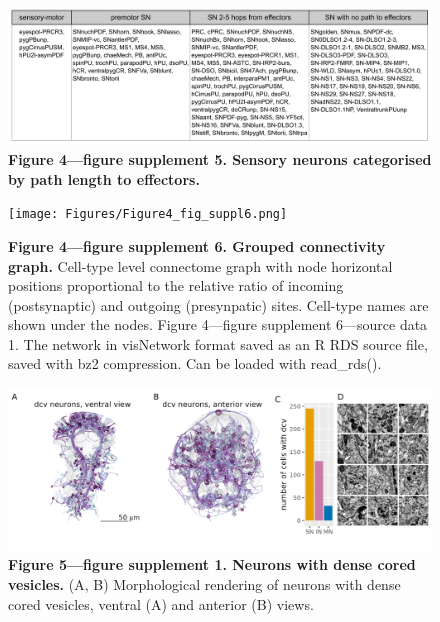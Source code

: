 \documentclass[
  11pt,
]{article}
\begin{document}
\begin{figure}[H]

{\centering \includegraphics[width=1\textwidth,height=\textheight]{Figures/Figure4_fig_suppl5.png}

}

\caption{\textbf{Figure 4---figure supplement 5. Sensory neurons
categorised by path length to effectors.}}

\end{figure}%

\begin{figure}[H]

{\centering \texttt{[image: Figures/Figure4\_fig\_suppl6.png]}

}

\caption{\textbf{Figure 4---figure supplement 6. Grouped connectivity
graph. } Cell-type level connectome graph with node horizontal positions
proportional to the relative ratio of incoming (postsynaptic) and
outgoing (presynpatic) sites. Cell-type names are shown under the nodes.
Figure 4---figure supplement 6---source data 1. The network in
visNetwork format saved as an R RDS source file, saved with bz2
compression. Can be loaded with read\_rds().}

\end{figure}%

\begin{figure}[H]

{\centering \includegraphics[width=1\textwidth,height=\textheight]{Figures/Figure5_fig_suppl1.png}

}

\caption{\textbf{Figure 5---figure supplement 1. Neurons with dense
cored vesicles.} (A, B) Morphological rendering of neurons with dense
cored vesicles, ventral (A) and anterior (B) views.}

\end{figure}%
\end{document}
